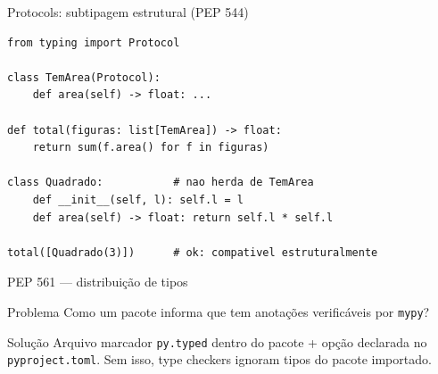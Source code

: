 \documentclass[aspectratio=169]{beamer}
\begin{document}
\begin{frame}[fragile]{Protocols: subtipagem estrutural (PEP 544)}
\begin{lstlisting}
from typing import Protocol

class TemArea(Protocol):
    def area(self) -> float: ...

def total(figuras: list[TemArea]) -> float:
    return sum(f.area() for f in figuras)

class Quadrado:           # nao herda de TemArea
    def __init__(self, l): self.l = l
    def area(self) -> float: return self.l * self.l

total([Quadrado(3)])      # ok: compativel estruturalmente
\end{lstlisting}
\end{frame}

\begin{frame}{PEP 561 --- distribuição de tipos}
  \begin{block}{Problema}
    Como um pacote informa que tem anotações verificáveis por \texttt{mypy}?
  \end{block}
  \begin{exampleblock}{Solução}
    Arquivo marcador \texttt{py.typed} dentro do pacote + opção declarada
    no \texttt{pyproject.toml}. Sem isso, type checkers ignoram tipos do
    pacote importado.
  \end{exampleblock}
\end{frame}
\end{document}
